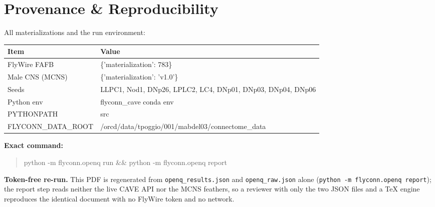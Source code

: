 \documentclass[11pt]{article}
\begin{document}
\section{Provenance \& Reproducibility}

All materializations and the run environment:

\begin{longtable}{@{}lp{}@{}}
\toprule
\textbf{Item} & \textbf{Value} \\
\midrule
\endhead
FlyWire FAFB & \{'materialization': 783\} \\
Male CNS (MCNS) & \{'materialization': 'v1.0'\} \\
Seeds & LLPC1, Nod1, DNp26, LPLC2, LC4, DNp01, DNp03, DNp04, DNp06 \\
Python env & flyconn\_cave conda env \\
PYTHONPATH & src \\
FLYCONN\_DATA\_ROOT & /orcd/data/tpoggio/001/mabdel03/connectome\_data \\
\bottomrule
\end{longtable}

\noindent\textbf{Exact command:}
\begin{quote}\ttfamily python -m flyconn.openq run \&\& python -m flyconn.openq report\end{quote}

\noindent\textbf{Token-free re-run.} This PDF is regenerated from \texttt{openq\_results.json} and \texttt{openq\_raw.json} alone (\texttt{python -m flyconn.openq report}); the report step reads neither the live CAVE API nor the MCNS feathers, so a reviewer with only the two JSON files and a TeX engine reproduces the identical document with no FlyWire token and no network.
\end{document}
